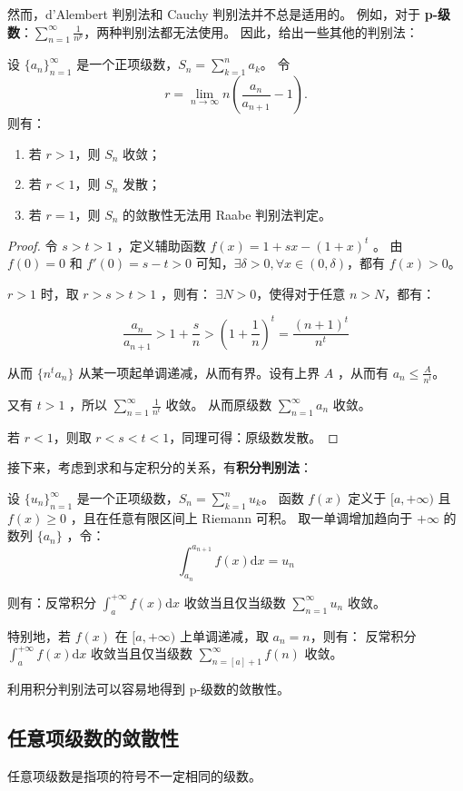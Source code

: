 然而，d'Alembert 判别法和 Cauchy 判别法并不总是适用的。
例如，对于 \textbf{p-级数}：$\sum_{n=1}^{\infty} \frac{1}{n^p}$，两种判别法都无法使用。
因此，给出一些其他的判别法：

\begin{theorem}\label{thm:raabe-test}
  设 $\{a_n\}_{n=1}^{\infty}$ 是一个正项级数，$S_n = \sum_{k=1}^{n} a_k$。
  令
  \begin{equation*}
    r = \lim_{n \to \infty} n \left( \frac{a_n}{a_{n+1}} - 1\right).
  \end{equation*}
  则有：
  \begin{enumerate}
    \item 若 $r > 1$，则 $S_n$ 收敛；
    \item 若 $r < 1$，则 $S_n$ 发散；
    \item 若 $r = 1$，则 $S_n$ 的敛散性无法用 Raabe 判别法判定。
  \end{enumerate}
\end{theorem}

\begin{proof}
  令 $s>t>1$ ，定义辅助函数 $f(x) = 1 + sx - (1 + x)^t$ 。
  由 $f(0) = 0$ 和 $f'(0) = s - t > 0$ 可知，$\exists \delta > 0, \forall x \in (0, \delta)$，都有 $f(x) > 0$。

  $r > 1$ 时，取 $r > s > t > 1$ ，则有： $\exists N > 0$，使得对于任意 $n > N$，都有：

  \begin{equation*}
    \frac{a_n}{a_{n+1}} > 1 + \frac{s}{n} > \left(1 + \frac{1}{n}\right)^t = \frac{(n+1)^t}{n^t}
  \end{equation*}

  从而 $\{n^t a_n\}$ 从某一项起单调递减，从而有界。设有上界 $A$ ，从而有 $a_n \leq \frac{A}{n^t}$。

  又有 $t > 1$ ，所以 $\sum_{n=1}^{\infty} \frac{1}{n^t}$ 收敛。
  从而原级数 $\sum_{n=1}^{\infty} a_n$ 收敛。

  若 $r < 1$，则取 $r < s < t < 1$，同理可得：原级数发散。

\end{proof}

接下来，考虑到求和与定积分的关系，有\textbf{积分判别法}：

\begin{theorem}[积分判别法]\label{thm:integral-test}
  设 $\{u_n\}_{n=1}^{\infty}$ 是一个正项级数，$S_n = \sum_{k=1}^{n} u_k$。
  函数 $f(x)$ 定义于 $[a, +\infty)$ 且 $f(x) \geq 0$ ，且在任意有限区间上 Riemann 可积。
  取一单调增加趋向于 $+\infty$ 的数列 $\{a_n\}$ ，令：$$\int_{a_n}^{a_{n+1}} f(x) \mathrm{d}x = u_n$$

  则有：反常积分 $\int_{a}^{+\infty} f(x) \mathrm{d}x$ 收敛当且仅当级数 $\sum_{n=1}^{\infty} u_n$ 收敛。

  特别地，若 $f(x)$ 在 $[a, +\infty)$ 上单调递减，取 $a_n = n$，则有：
  反常积分 $\int_{a}^{+\infty} f(x) \mathrm{d}x$ 收敛当且仅当级数 $\sum_{n=[a]+1}^{\infty} f(n)$ 收敛。
\end{theorem}

利用积分判别法可以容易地得到 p-级数的敛散性。

\subsection{任意项级数的敛散性}\label{subsec:arbitrary-series-convergence}

任意项级数是指项的符号不一定相同的级数。

